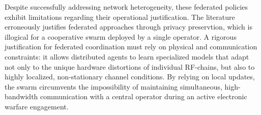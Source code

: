 \documentclass[journal]{IEEEtran}
\newcommand{\adm}[1]{{\color{orange}{[#1]}}}
\begin{document}
Despite successfully addressing network heterogeneity, these federated policies exhibit limitations regarding their operational justification.
The literature erroneously justifies federated approaches through privacy preservtion, which is illogical for a cooperative swarm deployed by a single operator. 
A rigorous justification for federated coordination must rely on physical and communication constraints: it allows distributed agents to learn specialized models that adapt not only to the unique hardware distortions of individual RF-chains, but also to highly localized, non-stationary channel conditions.
By relying on local updates, the swarm circumvents the impossibility of maintaining simultaneous, high-bandwidth communication with a central operator during an active electronic warfare engagement.
\end{document}
